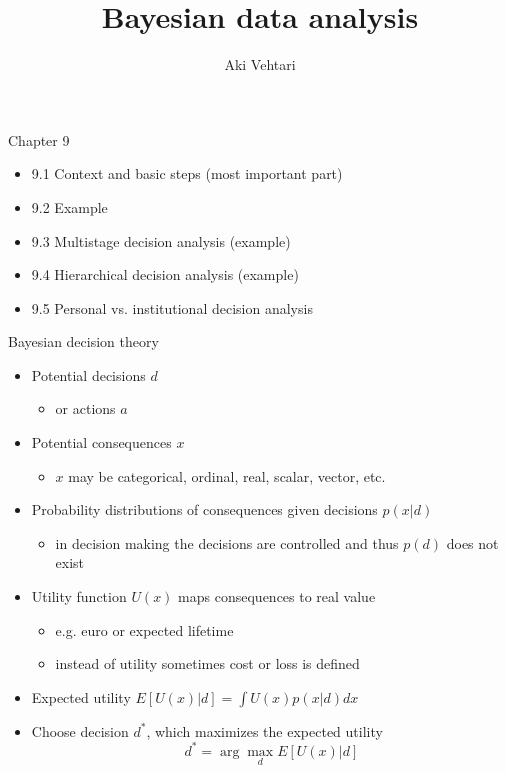\documentclass[t]{beamer}
\title[]{Bayesian data analysis}
\subtitle{}
\author{Aki Vehtari}
\institute[Aalto]{}
\begin{document}
\begin{frame}

  {\Large\color{navyblue} Chapter 9}

  \begin{itemize}
\item 9.1 Context and basic steps (most important part)
\item 9.2 Example
\item 9.3 Multistage decision analysis (example)
\item 9.4 Hierarchical decision analysis (example)
\item 9.5 Personal vs. institutional decision analysis
\end{itemize}
\end{frame}

\begin{frame}

  {\Large\color{navyblue} Bayesian decision theory}

  \begin{itemize}
  \item<+-> Potential decisions $d$
    \begin{itemize}
      \item or actions $a$
    \end{itemize}
  \item<+-> Potential consequences $x$
    \begin{itemize}
      \item $x$ may be categorical, ordinal, real, scalar, vector, etc.
    \end{itemize}
  \item<+-> Probability distributions of consequences given decisions $p(x|d)$
    \begin{itemize}
    \item in decision making the decisions are controlled and thus $p(d)$ does not exist
    \end{itemize}
  \item<+->  Utility function $U(x)$ maps consequences to real value
    \begin{itemize}
      \item e.g. euro or expected lifetime
      \item instead of utility sometimes cost or loss is defined
    \end{itemize}
    \vspace{-1mm}
  \item<+-> Expected utility  $E[U(x)|d]=\int U(x) p(x|d) dx$
  \item<+-> Choose decision $d^*$, which maximizes the expected utility
    \begin{equation*}
      d^*=\arg\max_d E[U(x)|d]
    \end{equation*}
  \end{itemize}

\end{frame}
\end{document}
